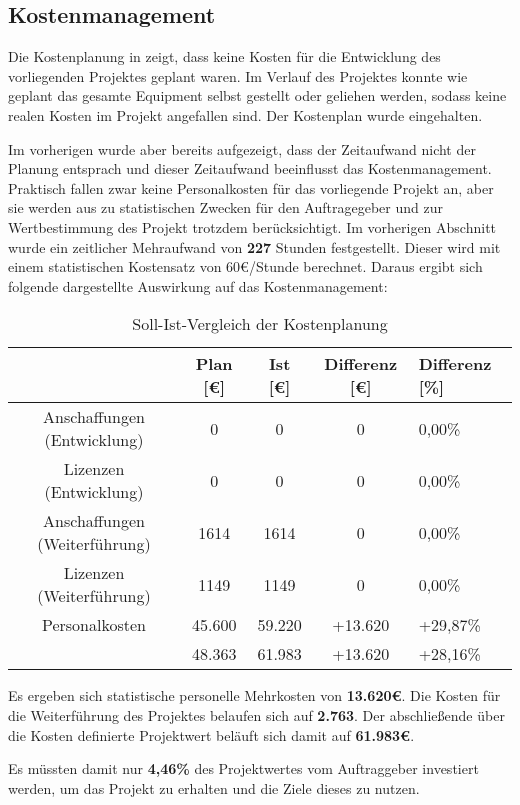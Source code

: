 \subsection{Kostenmanagement}
\label{sec:Kostenmanagement}


Die Kostenplanung in  zeigt, dass keine Kosten für die Entwicklung des vorliegenden Projektes
geplant waren. Im Verlauf des Projektes konnte wie geplant das gesamte Equipment selbst gestellt oder geliehen werden,
sodass keine realen Kosten im Projekt angefallen sind. Der Kostenplan wurde eingehalten.

Im vorherigen  wurde aber bereits aufgezeigt, dass der Zeitaufwand nicht der Planung entsprach und
dieser Zeitaufwand beeinflusst das Kostenmanagement. Praktisch fallen zwar keine Personalkosten für das vorliegende Projekt
an, aber sie werden aus zu statistischen Zwecken für den Auftragegeber und zur
Wertbestimmung des Projekt trotzdem berücksichtigt. Im vorherigen Abschnitt wurde ein zeitlicher Mehraufwand von \textbf{227} Stunden festgestellt. Dieser
wird mit einem statistischen Kostensatz von 60€/Stunde berechnet. Daraus ergibt sich folgende dargestellte
Auswirkung auf das Kostenmanagement:

\begin{table}[h]
\centering
\begin{tabular}{ccccl}
\hline
\multicolumn{1}{l}{}              & Plan {[}€{]} & Ist {[}€{]} & Differenz {[}€{]} & Differenz {[}\%{]} \\ \hline
Anschaffungen (Entwicklung)       & 0           & 0          & 0                   & 0,00\%          \\ \hline
Lizenzen (Entwicklung)            & 0           & 0          & 0                   & 0,00\%          \\ \hline
Anschaffungen (Weiterführung)     & 1614        & 1614       & 0                   & 0,00\%          \\ \hline
Lizenzen (Weiterführung)          & 1149        & 1149       & 0                   & 0,00\%          \\ \hline
Personalkosten                    & 45.600      & 59.220     & +13.620             & +29,87\%         \\ \hline
                                  & 48.363      & 61.983     & +13.620             & +28,16\%          \\ \hline
\end{tabular}
\caption{Soll-Ist-Vergleich der Kostenplanung}%
\label{tab:SollIstVergleichKosten}%
\end{table}

Es ergeben sich statistische personelle Mehrkosten von \textbf{13.620€}. Die Kosten
für die Weiterführung des Projektes belaufen sich auf \textbf{2.763}. Der abschließende
über die Kosten definierte Projektwert beläuft sich damit auf \textbf{61.983€}.

Es müssten damit nur \textbf{4,46\%} des Projektwertes vom Auftraggeber investiert werden,
um das Projekt zu erhalten und die Ziele dieses zu nutzen.